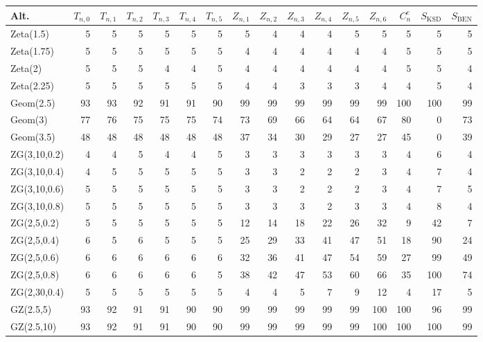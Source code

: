 \documentclass{article}
\theoremstyle{thm}
\theoremstyle{def}
\begin{document}
\begin{table}[t]
\setlength{\tabcolsep}{1.25mm}
\centering
\begin{tabular}{l|rrrrrrrrrrrrrrr}
 Alt. & $T_{n,0}$ & $T_{n,1}$ & $T_{n,2}$ & $T_{n,3}$ & $T_{n,4}$ & $T_{n,5}$ & $Z_{n,1}$ & $Z_{n,2}$ & $Z_{n,3}$ & $Z_{n,4}$ & $Z_{n,5}$ & $Z_{n,6}$ & $C_n^e$& $S_{\mathrm{KSD}}$ & $S_{\mathrm{BEN}}$\\
  \hline
  Zeta(1.5) & 5 & 5 & 5 & 5 & 5 & 5 & 5 & 4 & 4 & 4 & 5 & 5 & 5 & 5 & 5 \\
  Zeta(1.75) & 5 & 5 & 5 & 5 & 5 & 5 & 4 & 4 & 4 & 4 & 4 & 4 & 5 & 5 & 5 \\
  Zeta(2) & 5 & 5 & 5 & 4 & 4 & 5 & 4 & 4 & 4 & 4 & 4 & 4 & 5 & 5 & 4 \\
  Zeta(2.25) & 5 & 5 & 5 & 5 & 5 & 5 & 4 & 4 & 3 & 3 & 3 & 4 & 4 & 5 & 4 \\ \hline
  Geom(2.5) & 93 & 93 & 92 & 91 & 91 & 90 & 99 & 99 & 99 & 99 & 99 & 99 & 100 & 100 & 99 \\
  Geom(3) & 77 & 76 & 75 & 75 & 75 & 74 & 73 & 69 & 66 & 64 & 64 & 67 & 80 & 0 & 73 \\
  Geom(3.5)& 48 & 48 & 48 & 48 & 48 & 48 & 37 & 34 & 30 & 29 & 27 & 27 & 45 & 0 & 39 \\
ZG(3,10,0.2) & 4 & 4 & 5 & 4 & 4 & 5 & 3 & 3 & 3 & 3 & 3 & 3 & 4 & 6 & 4 \\
  ZG(3,10,0.4) & 4 & 5 & 5 & 5 & 5 & 5 & 3 & 3 & 2 & 2 & 2 & 3 & 4 & 7 & 4 \\
  ZG(3,10,0.6) & 5 & 5 & 5 & 5 & 5 & 5 & 3 & 3 & 2 & 2 & 2 & 3 & 4 & 7 & 5 \\
  ZG(3,10,0.8) & 5 & 5 & 5 & 5 & 5 & 5 & 3 & 3 & 3 & 2 & 3 & 3 & 4 & 8 & 4 \\
  ZG(2,5,0.2) & 5 & 5 & 5 & 5 & 5 & 5 & 12 & 14 & 18 & 22 & 26 & 32 & 9 & 42 & 7 \\
  ZG(2,5,0.4) & 6 & 5 & 6 & 5 & 5 & 5 & 25 & 29 & 33 & 41 & 47 & 51 & 18 & 90 & 24 \\
  ZG(2,5,0.6) & 6 & 6 & 6 & 6 & 6 & 6 & 32 & 36 & 41 & 47 & 54 & 59 & 27 & 99 & 49 \\
  ZG(2,5,0.8) & 6 & 6 & 6 & 6 & 6 & 5 & 38 & 42 & 47 & 53 & 60 & 66 & 35 & 100 & 74 \\
  ZG(2,30,0.4) & 5 & 5 & 5 & 5 & 5 & 5 & 4 & 4 & 5 & 7 & 9 & 12 & 4 & 17 & 5 \\
  GZ(2.5,5) & 93 & 92 & 91 & 91 & 90 & 90 & 99 & 99 & 99 & 99 & 99 & 100 & 100 & 96 & 99 \\
  GZ(2.5,10) & 93 & 92 & 91 & 91 & 90 & 90 & 99 & 99 & 99 & 99 & 99 & 100 & 100 & 100 & 99 \\

\end{tabular}
\end{table}
\end{document}
